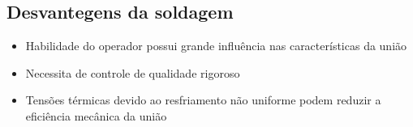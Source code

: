 \subsection{Desvantegens da soldagem}
\begin{itemize}
	\item Habilidade do operador possui grande influência nas características da união
	\item Necessita de controle de qualidade rigoroso
	\item Tensões térmicas devido ao resfriamento não uniforme podem reduzir a eficiência mecânica da união
\end{itemize}

